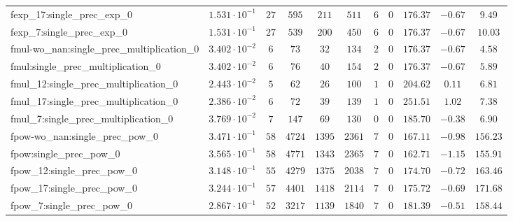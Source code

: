 \begin{tabular}{|l|c|c|c|c|c|c|c|c|c|c|}
fexp\_17:single\_prec\_exp\_0                  & $ 1.531 \cdot 10^{-1} $ & $ 27     $ & $ 595    $ & $ 211   $ & $ 511    $ & $ 6   $ & $ 0 $ & $ 176.37      $ & $ -0.67   $ & $ 9.49    $ \\
fexp\_7:single\_prec\_exp\_0                   & $ 1.531 \cdot 10^{-1} $ & $ 27     $ & $ 539    $ & $ 200   $ & $ 450    $ & $ 6   $ & $ 0 $ & $ 176.37      $ & $ -0.67   $ & $ 10.03   $ \\
fmul-wo\_nan:single\_prec\_multiplication\_0   & $ 3.402 \cdot 10^{-2} $ & $ 6      $ & $ 73     $ & $ 32    $ & $ 134    $ & $ 2   $ & $ 0 $ & $ 176.37      $ & $ -0.67   $ & $ 4.58    $ \\
fmul:single\_prec\_multiplication\_0           & $ 3.402 \cdot 10^{-2} $ & $ 6      $ & $ 76     $ & $ 40    $ & $ 154    $ & $ 2   $ & $ 0 $ & $ 176.37      $ & $ -0.67   $ & $ 5.89    $ \\
fmul\_12:single\_prec\_multiplication\_0       & $ 2.443 \cdot 10^{-2} $ & $ 5      $ & $ 62     $ & $ 26    $ & $ 100    $ & $ 1   $ & $ 0 $ & $ 204.62      $ & $ 0.11    $ & $ 6.81    $ \\
fmul\_17:single\_prec\_multiplication\_0       & $ 2.386 \cdot 10^{-2} $ & $ 6      $ & $ 72     $ & $ 39    $ & $ 139    $ & $ 1   $ & $ 0 $ & $ 251.51      $ & $ 1.02    $ & $ 7.38    $ \\
fmul\_7:single\_prec\_multiplication\_0        & $ 3.769 \cdot 10^{-2} $ & $ 7      $ & $ 147    $ & $ 69    $ & $ 130    $ & $ 0   $ & $ 0 $ & $ 185.70      $ & $ -0.38   $ & $ 6.90    $ \\
fpow-wo\_nan:single\_prec\_pow\_0              & $ 3.471 \cdot 10^{-1} $ & $ 58     $ & $ 4724   $ & $ 1395  $ & $ 2361   $ & $ 7   $ & $ 0 $ & $ 167.11      $ & $ -0.98   $ & $ 156.23  $ \\
fpow:single\_prec\_pow\_0                      & $ 3.565 \cdot 10^{-1} $ & $ 58     $ & $ 4771   $ & $ 1343  $ & $ 2365   $ & $ 7   $ & $ 0 $ & $ 162.71      $ & $ -1.15   $ & $ 155.91  $ \\
fpow\_12:single\_prec\_pow\_0                  & $ 3.148 \cdot 10^{-1} $ & $ 55     $ & $ 4279   $ & $ 1375  $ & $ 2038   $ & $ 7   $ & $ 0 $ & $ 174.70      $ & $ -0.72   $ & $ 163.46  $ \\
fpow\_17:single\_prec\_pow\_0                  & $ 3.244 \cdot 10^{-1} $ & $ 57     $ & $ 4401   $ & $ 1418  $ & $ 2114   $ & $ 7   $ & $ 0 $ & $ 175.72      $ & $ -0.69   $ & $ 171.68  $ \\
fpow\_7:single\_prec\_pow\_0                   & $ 2.867 \cdot 10^{-1} $ & $ 52     $ & $ 3217   $ & $ 1139  $ & $ 1840   $ & $ 7   $ & $ 0 $ & $ 181.39      $ & $ -0.51   $ & $ 158.44  $ \\

\end{tabular}
